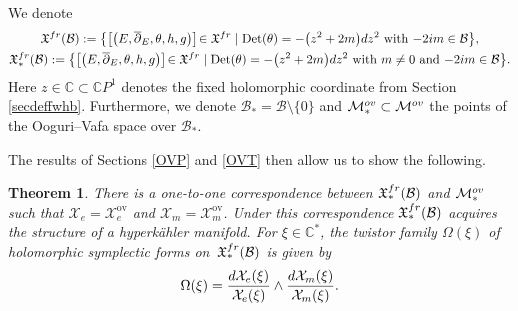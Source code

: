 \documentclass[11pt]{article}
\numberwithin{equation}{section}
\newtheorem{Theorem}{Theorem}[section]
\numberwithin{equation}{section}
\newcommand{\CP}{\mathbb{C}P^1}
\newcommand{\MC}{\mathcal{X}_m}
\begin{document}
\begin{Definition} We denote
\begin{gather*}
\mathfrak{X}^{\textnormal{fr}}(\mathcal{B}):=\bigl\{\bigl[\bigl(E,\overline{\partial}_E,\theta,h,g\bigr)\bigr] \!\in \mathfrak{X}^{\textnormal{fr}} \mid \operatorname{Det}(\theta)=-\bigl(z^2+2m\bigr){\rm d}z^2\ \text{with $-2{\rm i}m\in \mathcal{B}$}\bigr\},\\
 \mathfrak{X}^{\textnormal{fr}}_*(\mathcal{B}):=\bigl\{\bigl[\bigl(E,\overline{\partial}_E,\theta,h,g\bigr)\bigr]\! \in \mathfrak{X}^{\textnormal{fr}} \mid \operatorname{Det}(\theta)=-\bigl(z^2+2m\bigr){\rm d}z^2\ \text{with $m\neq 0$ and $-2{\rm i}m\in \mathcal{B}$}\bigr\}.
\end{gather*}
Here $z\in \mathbb{C}\subset \CP$ denotes the fixed holomorphic coordinate from Section \ref{secdeffwhb}. Furthermore, we denote $\mathcal{B}_*=\mathcal{B}\setminus\{0\}$ and $\mathcal{M}_*^{\textnormal{ov}} \subset \mathcal{M}^{\textnormal{ov}}$ the points of the Ooguri--Vafa space over $\mathcal{B}_*$.
\end{Definition}

The results of Sections \ref{OVP} and \ref{OVT} then allow us to show the following.

\begin{Theorem}\label{HKM} There is a one-to-one correspondence between $\mathfrak{X}^{\textnormal{fr}}_*(\mathcal{B})$ and $\mathcal{M}^{\textnormal{ov}}_*$ such that ${\mathcal{X}_e=\mathcal{X}_e^{\text{ov}}}$ and $\mathcal{X}_m=\mathcal{X}_m^{\text{ov}}$. Under this correspondence $\mathfrak{X}^{\textnormal{fr}}_*(\mathcal{B})$ acquires the structure of a hyperk\"ahler manifold. For $\xi \in \mathbb{C}^*$, the twistor family $\Omega(\xi)$ of holomorphic symplectic forms on~$\mathfrak{X}^{\textnormal{fr}}_*(\mathcal{B})$ is given by
\begin{equation}\label{familyholsym2}
 \Omega(\xi)=\frac{{\rm d}\mathcal{X}_e(\xi)}{\mathcal{X}_e(\xi)}\wedge \frac{{\rm d}\MC(\xi)}{\MC(\xi)}.
\end{equation}
\end{Theorem}
\end{document}

